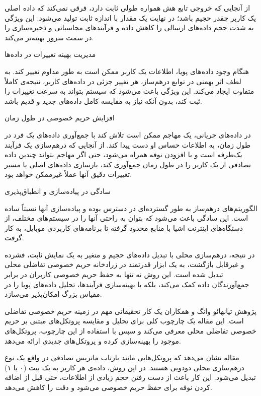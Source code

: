 از آنجایی که خروجی تابع هش همواره طولی ثابت دارد، فرقی نمی‌کند که داده اصلی یک کاربر چقدر حجیم باشد؛ در نهایت یک مقدار با اندازه ثابت تولید می‌شود. این ویژگی به شدت حجم داده‌های ارسالی را کاهش داده و فرآیندهای محاسباتی و ذخیره‌سازی را در سمت سرور بهینه‌تر می‌کند.

 مدیریت بهینه تغییرات در داده‌ها
 
هنگام وجود داده‌های پویا، اطلاعات یک کاربر ممکن است به طور مداوم تغییر کند. به لطف اثر بهمنی در توابع درهم‌ساز، هر تغییر جزئی در داده‌های کاربر، نتیجه‌ی کاملاً متفاوت ایجاد می‌کند. این ویژگی باعث می‌شود که سیستم بتواند به سرعت تغییرات را ثبت کند، بدون آنکه نیاز به مقایسه کامل داده‌های جدید و قدیم باشد.

 افزایش حریم خصوصی در طول زمان

در داده‌های جریانی، یک مهاجم ممکن است تلاش کند با جمع‌آوری داده‌های یک فرد در طول زمان، به اطلاعات حساس او دست پیدا کند. از آنجایی که درهم‌سازی یک فرآیند یک‌طرفه است و با افزودن نوفه همراه می‌شود، حتی اگر مهاجم بتواند چندین داده تصادفی از یک کاربر را در طول زمان جمع‌آوری کند، بازسازی داده‌های اصلی یا مسیر تغییرات دقیق آنها عملاً غیرممکن خواهد بود.

 سادگی در پیاده‌سازی و انطباق‌پذیری

الگوریتم‌های درهم‌ساز به طور گسترده‌ای در دسترس بوده و پیاده‌سازی آنها نسبتاً ساده است. این سادگی باعث می‌شود که بتوان به راحتی آنها را در سیستم‌های مختلف، از دستگاه‌های اینترنت اشیا با منابع محدود گرفته تا برنامه‌های کاربردی موبایل، به کار گرفت.


در نتیجه، درهم‌سازی محلی با تبدیل داده‌های حجیم و متغیر به یک نمایش ثابت، فشرده و غیرقابل بازگشت، به یک ابزار قدرتمند در زرادخانه حریم خصوصی تفاضلی محلی تبدیل شده است. این روش نه تنها به حفظ حریم خصوصی کاربران در برابر جمع‌آورندگان داده کمک می‌کند، بلکه با بهینه‌سازی فرآیندها، تحلیل داده‌های پویا را در مقیاس بزرگ امکان‌پذیر می‌سازد.


پژوهش تیانهائو وانگ و همکاران  یک کار تحقیقاتی مهم در زمینه حریم خصوصی تفاضلی است. این مقاله یک چارچوب کلی برای تحلیل و مقایسه پروتکل‌های مبتنی بر حریم خصوصی تفاضلی محلی معرفی می‌کند و سپس با استفاده از این چارچوب، پروتکل‌های موجود را بهینه‌سازی کرده و پروتکل‌های جدیدی ارائه می‌دهد.

مقاله نشان می‌دهد که پروتکل‌هایی مانند بازتاب ماتریس تصادفی در واقع یک نوع درهم‌سازی محلی دودویی هستند. در این روش، داده‌ی هر کاربر به یک بیت (۰ یا ۱) تبدیل می‌شود. این کار باعث از دست رفتن حجم زیادی از اطلاعات، حتی قبل از اضافه کردن نوفه برای حفظ حریم خصوصی می‌شود و دقت را کاهش می‌دهد.

